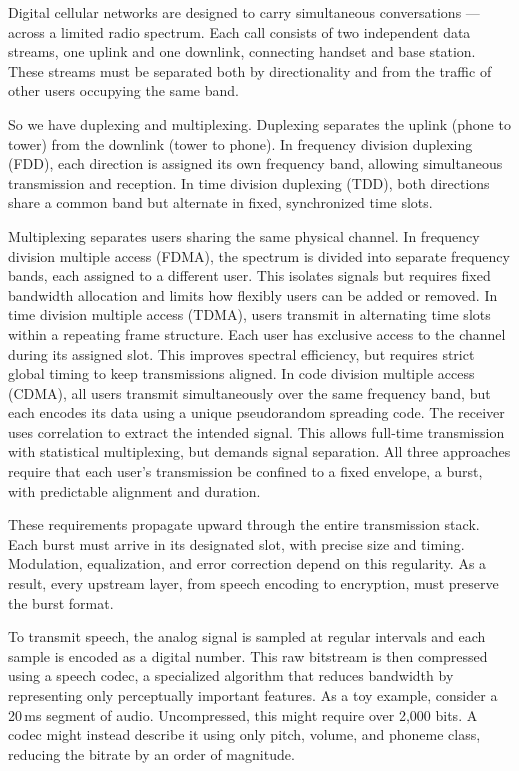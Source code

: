 Digital cellular networks are designed to carry simultaneous conversations — across a limited radio spectrum. Each call consists of two independent data streams, one uplink and one downlink, connecting handset and base station. These streams must be separated both by directionality and from the traffic of other users occupying the same band.

So we have duplexing and multiplexing. Duplexing separates the uplink (phone to tower) from the downlink (tower to phone). In frequency division duplexing (FDD), each direction is assigned its own frequency band, allowing simultaneous transmission and reception. In time division duplexing (TDD), both directions share a common band but alternate in fixed, synchronized time slots.

Multiplexing separates users sharing the same physical channel. In frequency division multiple access (FDMA), the spectrum is divided into separate frequency bands, each assigned to a different user. This isolates signals but requires fixed bandwidth allocation and limits how flexibly users can be added or removed. In time division multiple access (TDMA), users transmit in alternating time slots within a repeating frame structure. Each user has exclusive access to the channel during its assigned slot. This improves spectral efficiency, but requires strict global timing to keep transmissions aligned. In code division multiple access (CDMA), all users transmit simultaneously over the same frequency band, but each encodes its data using a unique pseudorandom spreading code. The receiver uses correlation to extract the intended signal. This allows full-time transmission with statistical multiplexing, but demands signal separation. All three approaches require that each user's transmission be confined to a fixed envelope, a burst, with predictable alignment and duration.

These requirements propagate upward through the entire transmission stack. Each burst must arrive in its designated slot, with precise size and timing. Modulation, equalization, and error correction depend on this regularity. As a result, every upstream layer, from speech encoding to encryption, must preserve the burst format.

To transmit speech, the analog signal is sampled at regular intervals and each sample is encoded as a digital number. This raw bitstream is then compressed using a speech codec, a specialized algorithm that reduces bandwidth by representing only perceptually important features. As a toy example, consider a 20 ms segment of audio. Uncompressed, this might require over 2,000 bits. A codec might instead describe it using only pitch, volume, and phoneme class, reducing the bitrate by an order of magnitude.

